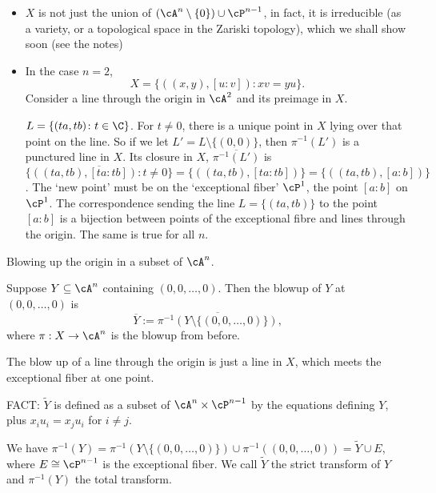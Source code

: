 \begin{itemize}
\item $X$ is not just the union of $(\cA^n \setminus \{0\}) \cup \cP^{n-1}$, in fact, it is irreducible (as a variety, or a topological space in the Zariski topology), which we shall show soon (see the notes)

\item In the case $n=2$, 
	\[
	X= \{ ((x,y), [u:v]) \colon xv=yu\}.
	\]
Consider a line through the origin in $\cA^2$ and its preimage in $X$. 


$L=\{ (ta,tb) \colon t \in \C\}$. For $t \neq 0$, there is a unique point in $X$ lying over that point on the line. So if we let $L'= L \setminus \{(0,0)\}$, then $\pi^{-1}(L')$ is a punctured line in $X$. Its closure in $X$, $\overline{\pi^{-1}(L')}$ is $\overline{\{((ta,tb), [ta:tb]) \colon t \neq 0\}}= \{ ((ta,tb),[ta:tb])\}= \{((ta,tb), [a:b])\}$. The `new point' must be on the `exceptional fiber' $\cP^1$, the point $[a:b]$ on $\cP^1$. The correspondence sending the line $L=\{(ta,tb)\}$ to the point $[a:b]$ is a bijection between points of the exceptional fibre and lines through the origin. The same is true for all $n$. 
\end{itemize}



Blowing up the origin in a subset of $\cA^n$. 

Suppose $Y \subseteq \cA^n$ containing $(0,0,\ldots,0)$. Then the blowup of $Y$ at $(0,0,\ldots,0)$ is 
	\[
	\overline{Y}:= \overline{\pi^{-1}(Y \setminus \{(0,0,\ldots,0)\})},
	\]
where $\pi: X \to \cA^n$ is the blowup from before.


The blow up of a line through the origin is just a line in $X$, which meets the exceptional fiber at one point. 


FACT: $\tilde{Y}$ is defined as a subset of $\cA^n \times \cP^{n-1}$ by the equations defining $Y$, plus $x_iu_i=x_ju_i$ for $i \neq j$. 

We have $\pi^{-1}(Y)= \pi^{-1}(Y \setminus \{(0,0,\ldots,0)\}) \cup \pi^{-1}((0,0,\ldots,0))= \tilde{Y} \cup E$, where $E \cong \cP^{n-1}$ is the exceptional fiber. We call $\tilde{Y}$ the strict transform of $Y$ and $\pi^{-1}(Y)$ the total transform. 








